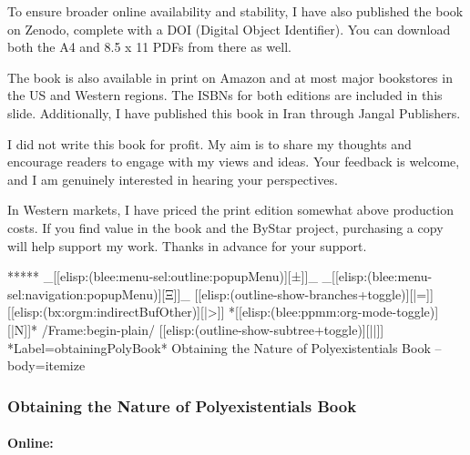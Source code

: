 \begin{whenOrg}
\begin{frame}[fragile,plain,label=obtainingPolyBookInsert]
{  To ensure broader online availability and stability, I have also published the book on
  Zenodo, complete with a DOI (Digital Object Identifier). You can download both the A4 and
  8.5 x 11 PDFs from there as well.

  The book is also available in print on Amazon and at most major bookstores in the US and
  Western regions. The ISBNs for both editions are included in this slide.
  Additionally, I have published this book in Iran through Jangal Publishers.

  I did not write this book for profit. My aim is to share my thoughts and encourage
  readers to engage with my views and ideas. Your feedback is welcome, and I am genuinely
  interested in hearing your perspectives.

  In Western markets, I have priced the print edition somewhat above production costs. If
  you find value in the book and the ByStar project, purchasing a copy will help support
  my work. Thanks in advance for your support.

}
\end{frame}



\begin{whenOrg}
*****  _[[elisp:(blee:menu-sel:outline:popupMenu)][±]]_ _[[elisp:(blee:menu-sel:navigation:popupMenu)][Ξ]]_ [[elisp:(outline-show-branches+toggle)][|=]] [[elisp:(bx:orgm:indirectBufOther)][|>]] *[[elisp:(blee:ppmm:org-mode-toggle)][|N]]*  /Frame:begin-plain/ [[elisp:(outline-show-subtree+toggle)][||]] *Label=obtainingPolyBook* Obtaining the Nature of Polyexistentials Book -- body=itemize
\end{whenOrg}

\begin{frame}[fragile,plain,label=obtainingPolyBook]
    \frametitle{Obtaining the Nature of Polyexistentials Book}
    \framesubtitle{}

\begin{htmlonly} %
    \begin{center}
          \textbf{Online:}
    \end{center}
\end{htmlonly}


\end{frame}
\end{whenOrg}
